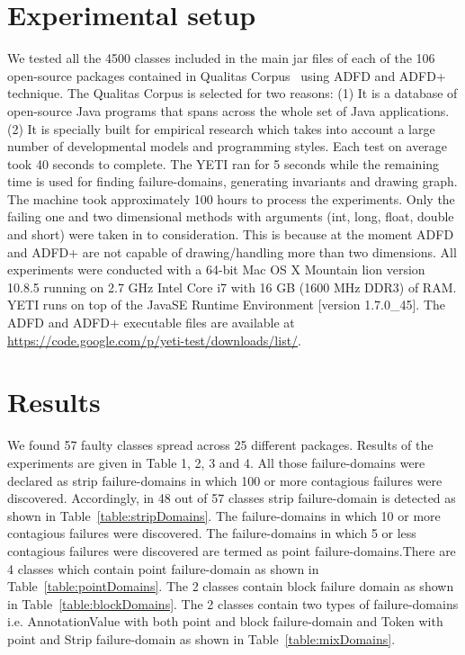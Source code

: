 \documentclass[runningheads,a4paper]{llncs}
\begin{document}
\section{Experimental setup}
We tested all the 4500 classes included in the main jar files of each of the 106 open-source packages contained in Qualitas Corpus~\cite{Tempero2010} using ADFD and ADFD+ technique. The Qualitas Corpus is selected for two reasons: (1) It is a database of open-source Java programs that spans across the whole set of Java applications. (2) It is specially built for empirical research which takes into account a large number of developmental models and programming styles. Each test on average took 40 seconds to complete. The YETI ran for 5 seconds while the remaining time is used for finding failure-domains, generating invariants and drawing graph. The machine took approximately 100 hours to process the experiments. Only the failing one and two dimensional methods with arguments (int, long, float, double and short) were taken in to consideration. This is because at the moment ADFD and ADFD+ are not capable of drawing/handling more than two dimensions. All experiments were conducted with a 64-bit Mac OS X Mountain lion version 10.8.5 running on 2.7 GHz Intel Core i7 with 16 GB (1600 MHz DDR3) of RAM. YETI runs on top of the Java\texttrademark  SE Runtime Environment [version 1.7.0\_45]. The ADFD and ADFD+ executable files are available at \url{https://code.google.com/p/yeti-test/downloads/list/}. 



\section{Results}
We found 57 faulty classes spread across 25 different packages. Results of the experiments are given in Table 1, 2, 3 and 4. All those failure-domains were declared as strip failure-domains in which 100 or more contagious failures were discovered. Accordingly, in 48 out of 57 classes strip failure-domain is detected as shown in Table~\ref{table:stripDomains}. The failure-domains in which 10 or more contagious failures were discovered. The failure-domains in which 5 or less contagious failures were discovered are termed as point failure-domains.There are 4 classes which contain point failure-domain as shown in Table~\ref{table:pointDomains}. The 2 classes contain block failure domain as shown in Table~\ref{table:blockDomains}. The 2 classes contain two types of failure-domains i.e. AnnotationValue with both point and block failure-domain and Token with point and Strip failure-domain as shown in Table~\ref{table:mixDomains}.
\end{document}

